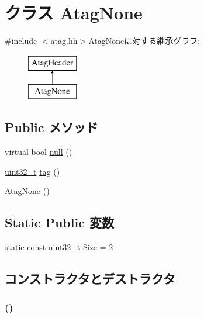 \hypertarget{classAtagNone}{
\section{クラス AtagNone}
\label{classAtagNone}
}


{\ttfamily \#include $<$atag.hh$>$}AtagNoneに対する継承グラフ:\begin{figure}[H]
\begin{center}
\leavevmode
\includegraphics[height=2cm]{classAtagNone}
\end{center}
\end{figure}
\subsection*{Public メソッド}
\begin{DoxyCompactItemize}
\item 
virtual bool \hyperlink{classAtagNone_a4af1ca4124e0ed6600fa7b8093eba309}{null} ()
\item 
\hyperlink{Type_8hh_a435d1572bf3f880d55459d9805097f62}{uint32\_\-t} \hyperlink{classAtagNone_afe29fbb80b1d2765e37e98c6d259ea52}{tag} ()
\item 
\hyperlink{classAtagNone_a28872c29aff8263f2f09de332c20ac96}{AtagNone} ()
\end{DoxyCompactItemize}
\subsection*{Static Public 変数}
\begin{DoxyCompactItemize}
\item 
static const \hyperlink{Type_8hh_a435d1572bf3f880d55459d9805097f62}{uint32\_\-t} \hyperlink{classAtagNone_a7ecea14dd0f3277e19580d4509fafdba}{Size} = 2
\end{DoxyCompactItemize}


\subsection{コンストラクタとデストラクタ}
\hypertarget{classAtagNone_a28872c29aff8263f2f09de332c20ac96}{
\subsubsection[{AtagNone}]{ ()}}
\label{classAtagNone_a28872c29aff8263f2f09de332c20ac96}



